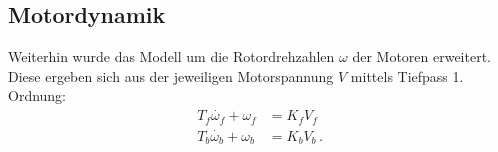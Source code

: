 \documentclass[10pt,twocolumn]{article}
\begin{document}

	\subsection{Motordynamik}

	Weiterhin wurde das Modell um die Rotordrehzahlen $\omega$ der Motoren erweitert. Diese ergeben sich aus der jeweiligen Motorspannung $V$ mittels Tiefpass 1. Ordnung:
	\begin{subequations}
	\begin{align}
	T_f \dot{\omega_f} + \omega_f &= K_f V_f\\
	T_b \dot{\omega_b} + \omega_b &= K_b V_b\, .
	\end{align}
\end{subequations}
\end{document}
